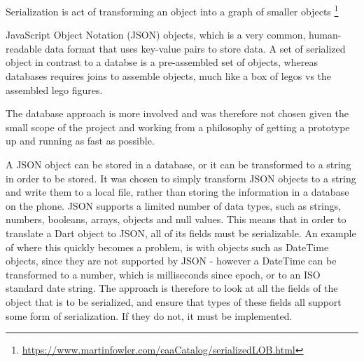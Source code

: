 Serialization is act of transforming an object into a graph of smaller objects \footnote{\url{https://www.martinfowler.com/eaaCatalog/serializedLOB.html}}


JavaScript Object Notation (JSON) objects, which is a very common, human-readable data format that uses key-value pairs to store data. 
A set of serialized object in contrast to a databse is a pre-assembled set of objects, whereas databases requires joins to assemble objects, much like a box of legos vs the assembled lego figures.

The database approach is more involved and was therefore not chosen given the small scope of the project and working from a philosophy of getting a prototype up and running as fast as possible.

A JSON object can be stored in a database, or it can be transformed to a string in order to be stored. It was chosen to simply transform JSON objects to a string and write them to a local file, rather than storing the information in a database on the phone. 
JSON supports a limited number of data types, such as strings, numbers, booleans, arrays, objects and null values. This means that in order to translate a Dart object to JSON, all of its fields must be serializable. An example of where this quickly becomes a problem, is with objects such as DateTime objects, since they are not supported by JSON - however a DateTime can be transformed to a number, which is milliseconds since epoch, or to an ISO standard date string. The approach is therefore to look at all the fields of the object that is to be serialized, and ensure that types of these fields all support some form of serialization. If they do not, it must be implemented.


